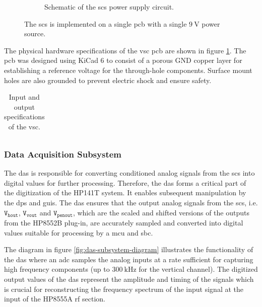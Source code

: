\documentclass[class=report,11pt,crop=false]{standalone}
\begin{document}
\begin{figure}[ht!]
\begin{subfigure}{.5\textwidth}
			\caption{Schematic of the \acrshort{scs} power supply circuit.}
			\label{fig:scs-power-schematic}
		\end{subfigure}
		\caption{The \acrshort{scs} is implemented on a single \acrshort{pcb} with a single $\SI{9}{\volt}$ power source.}
		\label{fig:scs-full-subsystem}
	\end{figure}

	The physical hardware specifications of the \acrshort{vsc} \acrshort{pcb} are shown in figure \ref{tab:sig-cond-vsc-hardware-specs}. The \acrshort{pcb} was designed using KiCad 6 to consist of a porous GND copper layer for establishing a reference voltage for the through-hole components. Surface mount holes are also grounded to prevent electric shock and ensure safety. 
	
	\begin{table}[ht!]
		\centering
		\label{tab:sig-cond-vsc-hardware-specs}
		\caption{Input and output specifications of the \acrshort{vsc}.}
		\begin{tabular}{ccc}
			
		\end{tabular}
	\end{table}

	\subsubsection{Data Acquisition Subsystem}
	
	The \acrfull{das} is responsible for converting conditioned analog signals from the \acrshort{scs} into digital values for further processing. Therefore, the \acrshort{das} forms a critical part of the digitization of the HP141T system. It enables subsequent manipulation by the \acrlong{dps} and \acrshort{guis}. The \acrshort{das} ensures that the output analog signals from the \acrshort{scs}, i.e. $\texttt{V}_\texttt{hout}$, $\texttt{V}_\texttt{vout}$ and $\texttt{V}_\texttt{penout}$, which are the scaled and shifted versions of the outputs from the HP8552B plug-in, are accurately sampled and converted into digital values suitable for processing by a \acrshort{mcu} and \acrshort{sbc}. 
	
	The diagram in figure \ref{fig:das-subsystem-diagram} illustrates the functionality of the \acrshort{das} where an \acrshort{adc} samples the analog inputs at a rate sufficient for capturing high frequency components (up to $\SI{300}{\kilo\hertz}$ for the vertical channel). The digitized output values of the \acrshort{das} represent the amplitude and timing of the signals which is crucial for reconstructing the frequency spectrum of the input signal at the input of the HP8555A \acrshort{rf} section.
	
\end{document}

